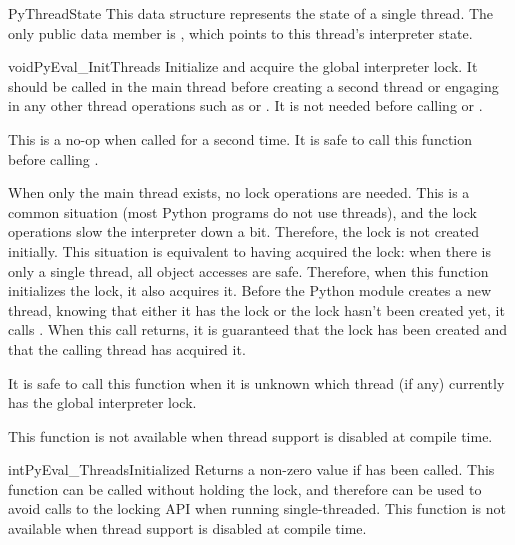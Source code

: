 \begin{ctypedesc}{PyThreadState}
  This data structure represents the state of a single thread.  The
  only public data member is , which points to this thread's interpreter state.
\end{ctypedesc}

\begin{cfuncdesc}{void}{PyEval_InitThreads}{}
  Initialize and acquire the global interpreter lock.  It should be
  called in the main thread before creating a second thread or
  engaging in any other thread operations such as
   or
  .
  It is not needed before calling
   or
  .

  This is a no-op when called for a second time.  It is safe to call
  this function before calling
  .

  When only the main thread exists, no lock operations are needed.
  This is a common situation (most Python programs do not use
  threads), and the lock operations slow the interpreter down a bit.
  Therefore, the lock is not created initially.  This situation is
  equivalent to having acquired the lock:  when there is only a single
  thread, all object accesses are safe.  Therefore, when this function
  initializes the lock, it also acquires it.  Before the Python
   module creates a new thread,
  knowing that either it has the lock or the lock hasn't been created
  yet, it calls .  When this call
  returns, it is guaranteed that the lock has been created and that the
  calling thread has acquired it.

  It is  safe to call this function when it is unknown
  which thread (if any) currently has the global interpreter lock.

  This function is not available when thread support is disabled at
  compile time.
\end{cfuncdesc}

\begin{cfuncdesc}{int}{PyEval_ThreadsInitialized}{}
  Returns a non-zero value if  has been
  called.  This function can be called without holding the lock, and
  therefore can be used to avoid calls to the locking API when running
  single-threaded.  This function is not available when thread support
  is disabled at compile time. 
\end{cfuncdesc}

